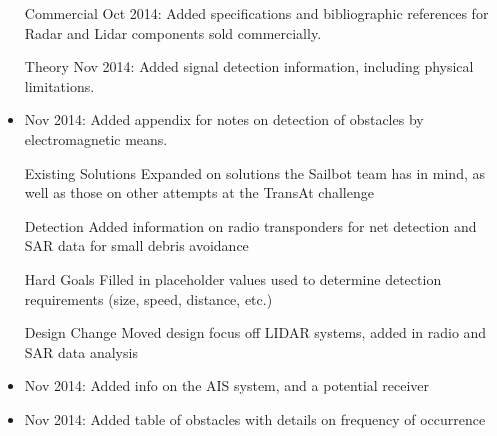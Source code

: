 \begin{itemize}
\item[Commercial] Oct 2014: Added specifications and bibliographic references for Radar and Lidar components sold commercially.
\item[Theory] Nov 2014: Added signal detection information, including physical limitations.
\item Nov 2014: Added appendix for notes on detection of obstacles by electromagnetic means.
\item[Existing Solutions] Expanded on solutions the Sailbot team has in mind, as well as those on other attempts at the TransAt challenge
\item[Detection] Added information on radio transponders for net detection and SAR data for small debris avoidance
\item[Hard Goals] Filled in placeholder values used to determine detection requirements (size, speed, distance, etc.)
\item[Design Change] Moved design focus off LIDAR systems, added in radio and SAR data analysis
\item Nov 2014: Added info on the AIS system, and a potential receiver
\item Nov 2014: Added table of obstacles with details on frequency of occurrence
\end{itemize}